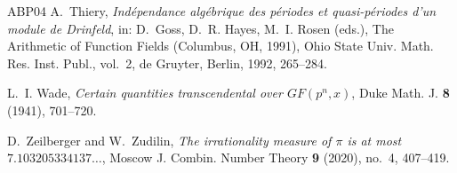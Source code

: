 \documentclass[11pt]{amsart}
\theoremstyle{remark}
\numberwithin{equation}{section}
\begin{document}
\begin{thebibliography}{ABP04}
A.~Thiery,
\emph{Ind\'ependance alg\'ebrique des p\'eriodes et quasi-p\'eriodes d'un module de Drinfeld},
in: D.~Goss, D.~R. Hayes, M.~I. Rosen (eds.), The Arithmetic of Function Fields (Columbus, OH, 1991),
Ohio State Univ. Math. Res. Inst. Publ., vol.~2, de Gruyter, Berlin, 1992, 265--284.

L.~I. Wade,
\emph{Certain quantities transcendental over $GF(p^n,x)$},
Duke Math. J. \textbf{8} (1941), 701--720.

D.~Zeilberger and W.~Zudilin,
\emph{The irrationality measure of $\pi$ is at most $7.103205334137\ldots$},
Moscow J. Combin. Number Theory \textbf{9} (2020), no.~4, 407--419.

\end{thebibliography}
\end{document}
